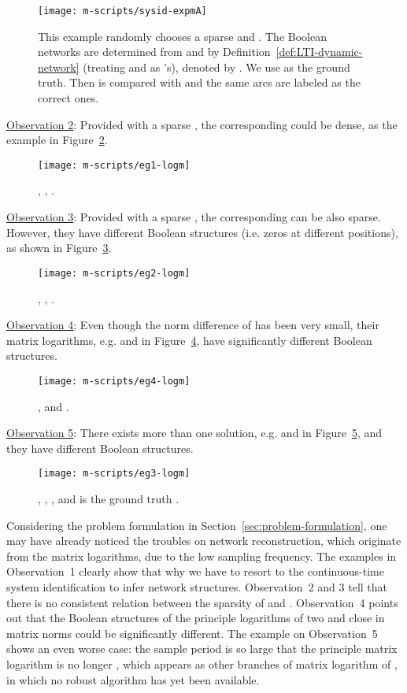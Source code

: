 \documentclass[letterpaper,10pt,journal,final]{IEEEtran}
\theoremstyle{definition}
\theoremstyle{remark}
\begin{document}
\begin{figure}[htb]   \centering
  \texttt{[image: m-scripts/sysid-expmA]}
  \caption{This example randomly chooses a sparse  and . The
    Boolean networks are determined from  and  by
    Definition~\ref{def:LTI-dynamic-network} (treating  and  as 's),
    denoted by . We use  as the
    ground truth. Then  is compared with  and
    the same arcs are labeled as the correct ones.}
  \label{fig:net-topol-A-Ad}
\end{figure}

\smallskip
\noindent\underline{Observation 2}: Provided with a sparse , the corresponding 
could be dense, as the example in Figure~\ref{fig:logm-eg-1}.
\begin{figure}[htb]
  \centering
  \texttt{[image: m-scripts/eg1-logm]}
    \caption{, , . }
    \label{fig:logm-eg-1}
\end{figure}

\smallskip
\noindent\underline{Observation 3}: Provided with a sparse , the corresponding 
can be also sparse. However, they have different Boolean structures (i.e. zeros at
different positions), as shown in Figure~\ref{fig:logm-eg-2}.
\begin{figure}[htb]
  \centering
    \texttt{[image: m-scripts/eg2-logm]}
    \caption{, , . }
    \label{fig:logm-eg-2}
\end{figure}

\smallskip
\noindent\underline{Observation 4}: Even though the norm difference of  has been
very small, their matrix logarithms, e.g.  and  in
Figure~\ref{fig:logm-eg-4}, have significantly different Boolean structures.
\begin{figure}[htb]
  \centering
    \texttt{[image: m-scripts/eg4-logm]}
    \caption{,  and .}
    \label{fig:logm-eg-4}
\end{figure}

\smallskip
\noindent\underline{Observation 5}: There exists more than one solution, e.g.  and
 in Figure~\ref{fig:logm-eg-3}, and they have different Boolean structures.
\begin{figure}[htb]
  \centering
    \texttt{[image: m-scripts/eg3-logm]}
    \caption{, , , and
       is the ground truth . }
    \label{fig:logm-eg-3}
\end{figure}

Considering the problem formulation in Section~\ref{sec:problem-formulation}, one may
have already noticed the troubles on network reconstruction, which originate from the
matrix logarithms, due to the low sampling frequency.  The examples in
{Observation~1} clearly show that why we have to resort to the continuous-time
system identification to infer network structures. {Observation~2} and
{3} tell that there is no consistent relation between the sparsity of  and
.  {Observation~4} points out that the Boolean structures of the
principle logarithms of two  and  close in matrix norms could be
significantly different.  The example on {Observation~5} shows an even worse
case: the sample period is so large that the principle matrix logarithm is no longer
, which appears as other branches of matrix logarithm of , in which no robust
algorithm has yet been available.
\end{document}
